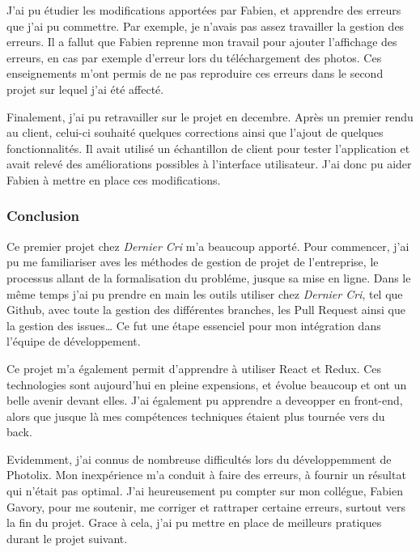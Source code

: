 \bigskip

J'ai pu étudier les modifications apportées par Fabien, et apprendre des
erreurs que j'ai pu commettre. Par exemple, je n'avais pas assez
travailler la gestion des erreurs. Il a fallut que Fabien reprenne mon
travail pour ajouter l'affichage des erreurs, en cas par exemple
d'erreur lors du téléchargement des photos. Ces enseignements m'ont
permis de ne pas reproduire ces erreurs dans le second projet sur lequel
j'ai été affecté.

\bigskip

Finalement, j'ai pu retravailler sur le projet en decembre. Après un
premier rendu au client, celui-ci souhaité quelques corrections ainsi
que l'ajout de quelques fonctionnalités. Il avait utilisé un échantillon
de client pour tester l'application et avait relevé des améliorations
possibles à l'interface utilisateur. J'ai donc pu aider Fabien à mettre
en place ces modifications.

\bigskip

\subsubsection{Conclusion}\label{conclusion}

\bigskip

Ce premier projet chez \emph{Dernier Cri} m'a beaucoup apporté. Pour
commencer, j'ai pu me familiariser aves les méthodes de gestion de
projet de l'entreprise, le processus allant de la formalisation du
probléme, jusque sa mise en ligne. Dans le même temps j'ai pu prendre en
main les outils utiliser chez \emph{Dernier Cri}, tel que Github, avec
toute la gestion des différentes branches, les Pull Request ainsi que la
gestion des issues\ldots{} Ce fut une étape essenciel pour mon
intégration dans l'équipe de développement.

\bigskip

Ce projet m'a également permit d'apprendre à utiliser React et Redux.
Ces technologies sont aujourd'hui en pleine expensions, et évolue
beaucoup et ont un belle avenir devant elles. J'ai également pu
apprendre a deveopper en front-end, alors que jusque là mes compétences
techniques étaient plus tournée vers du back.

\bigskip

Evidemment, j'ai connus de nombreuse difficultés lors du développemment
de Photolix. Mon inexpérience m'a conduit à faire des erreurs, à fournir
un résultat qui n'était pas optimal. J'ai heureusement pu compter sur
mon collégue, Fabien Gavory, pour me soutenir, me corriger et rattraper
certaine erreurs, surtout vers la fin du projet. Grace à cela, j'ai pu
mettre en place de meilleurs pratiques durant le projet suivant.

